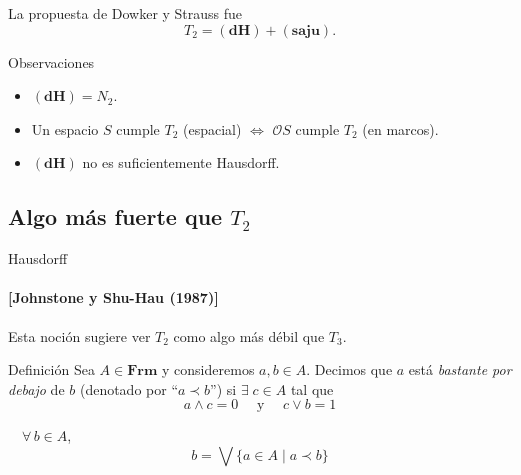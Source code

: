 \documentclass[compress,12pt]{beamer}
\begin{document}
\begin{frame}
        La propuesta de Dowker y Strauss fue
    \[
    T_2=\mathbf{(dH)}+\mathbf{(saju)}.
    \]

\begin{block}{Observaciones}
    \begin{itemize}
        \item<3-> $\mathbf{(dH)}=N_2$.
        \item<4-> Un espacio $S$ cumple $T_2$ (espacial) $\Leftrightarrow$ $\mathcal{O}S$ cumple $T_2$ (en marcos).
        \item<5-> $\mathbf{(dH)}$ no es suficientemente Hausdorff.
    \end{itemize}
\end{block}
    
\end{frame}

\subsection{Algo más fuerte que $T_2$}
\begin{frame}{Hausdorff}
\framesubtitle{[Johnstone y Shu-Hau (1987)]}
 Esta noción sugiere ver $T_2$ como algo más débil que $T_3$.\\
 
    \begin{block}{Definición}
    Sea $A\in \mathbf{Frm}$ y consideremos $a,b\in A$. Decimos que $a$ está \emph{bastante por debajo} de $b$ (denotado por ``$a\prec b$'') si $\exists\; c\in A$ tal que 
    \[
    a\wedge c=0 \quad\mbox{ y }\quad c\vee b=1
    \]
    \end{block}

\begin{description}
  \item<2->[$\mathbf{(reg)}$] $\quad\forall\, b\in A$,
    \[
    b=\bigvee\{a\in A\mid a\prec b\}
    \]
\end{description}
    
\end{frame}
\end{document}
